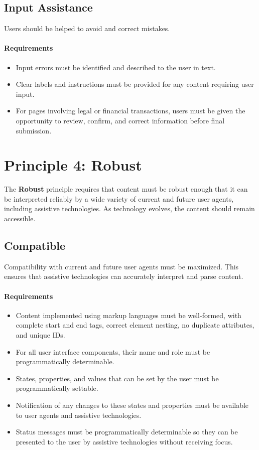 \documentclass{scrbook}
\begin{document}
\subsection{Input Assistance}
Users should be helped to avoid and correct mistakes.

\paragraph{Requirements}
\begin{itemize}
    \item Input errors must be identified and described to the user in text.
    \item Clear labels and instructions must be provided for any content requiring user input.
    \item For pages involving legal or financial transactions, users must be given the opportunity to review, confirm, and correct information before final submission.
\end{itemize}

\section{Principle 4: Robust}

The \textbf{Robust} principle requires that content must be robust enough that it can be interpreted reliably by a wide variety of current and future user agents, including assistive technologies. As technology evolves, the content should remain accessible.

\subsection{Compatible}
Compatibility with current and future user agents must be maximized. This ensures that assistive technologies can accurately interpret and parse content.

\paragraph{Requirements}
\begin{itemize}
    \item Content implemented using markup languages must be well-formed, with complete start and end tags, correct element nesting, no duplicate attributes, and unique IDs.
    \item For all user interface components, their name and role must be programmatically determinable.
    \item States, properties, and values that can be set by the user must be programmatically settable.
    \item Notification of any changes to these states and properties must be available to user agents and assistive technologies.
    \item Status messages must be programmatically determinable so they can be presented to the user by assistive technologies without receiving focus.
\end{itemize}
\end{document}
